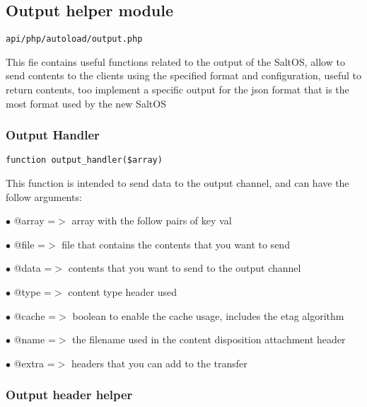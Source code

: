\documentclass[a4paper]{article}
\begin{document}
\hypertarget{toc182}{}
\subsection{Output helper module}

\begin{lstlisting}
api/php/autoload/output.php
\end{lstlisting}

This fie contains useful functions related to the output of the SaltOS, allow to send contents to
the clients using the specified format and configuration, useful to return contents, too implement
a specific output for the json format that is the most format used by the new SaltOS

\hypertarget{toc183}{}
\subsubsection{Output Handler}

\begin{lstlisting}
function output_handler($array)
\end{lstlisting}

This function is intended to send data to the output channel, and can have
the follow arguments:

\begin{compactitem}
\item[\color{myblue}$\bullet$] @array =$>$ array with the follow pairs of key val
\item[\color{myblue}$\bullet$] @file  =$>$ file that contains the contents that you want to send
\item[\color{myblue}$\bullet$] @data  =$>$ contents that you want to send to the output channel
\item[\color{myblue}$\bullet$] @type  =$>$ content type header used
\item[\color{myblue}$\bullet$] @cache =$>$ boolean to enable the cache usage, includes the etag algorithm
\item[\color{myblue}$\bullet$] @name  =$>$ the filename used in the content disposition attachment header
\item[\color{myblue}$\bullet$] @extra =$>$ headers that you can add to the transfer
\end{compactitem}

\hypertarget{toc184}{}
\subsubsection{Output header helper}
\end{document}
